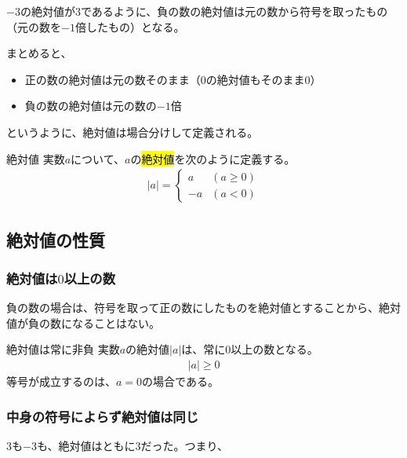 \documentclass[../../imaging-math]{subfiles}
\begin{document}
$-3$の絶対値が$3$であるように、負の数の絶対値は元の数から符号を取ったもの（元の数を$-1$倍したもの）となる。

まとめると、

\begin{itemize}
  \item 正の数の絶対値は元の数そのまま（$0$の絶対値もそのまま$0$）
  \item 負の数の絶対値は元の数の$-1$倍
\end{itemize}

というように、絶対値は場合分けして定義される。

\begin{definition}{絶対値}
  \newline
  実数$a$について、$a$の\hl{絶対値}を次のように定義する。
  \LARGE
  \begin{align}
    |a| = \begin{cases}
            a  & (a \geq  0) \\
            -a & (a < 0)
          \end{cases}
  \end{align}
\end{definition}

\subsection{絶対値の性質}

\subsubsection{絶対値は$0$以上の数}

負の数の場合は、符号を取って正の数にしたものを絶対値とすることから、絶対値が負の数になることはない。

\begin{theorem}{絶対値は常に非負}
  \newline
  実数$a$の絶対値$|a|$は、常に$0$以上の数となる。
  \LARGE
  \begin{align}
    |a| \geq 0
  \end{align}
  \normalsize
  等号が成立するのは、$a=0$の場合である。
\end{theorem}

\subsubsection{中身の符号によらず絶対値は同じ}

$3$も$-3$も、絶対値はともに$3$だった。つまり、
\end{document}
